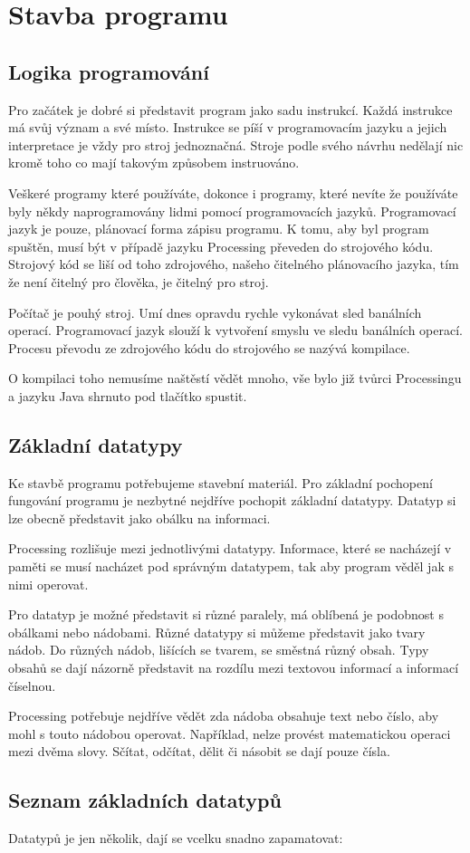 \documentclass[11pt]{book}
\newcommand{\oddil}[1]{\section{#1}\label{sec:#1}}
\newcommand{\pododdil}[1]{\subsection{#1}\label{subsec:#1}}
\begin{document}
\newpage
\oddil{Stavba programu}

\pododdil{Logika programování}
Pro začátek je dobré si představit program jako sadu instrukcí. Každá instrukce má svůj význam a své místo. Instrukce se píší v programovacím jazyku a jejich interpretace je vždy pro stroj jednoznačná. Stroje podle svého návrhu nedělají nic kromě toho co mají takovým způsobem instruováno.

Veškeré programy které používáte, dokonce i programy, které nevíte že používáte byly někdy naprogramovány lidmi pomocí programovacích jazyků. Programovací jazyk je pouze, plánovací forma zápisu programu. K tomu, aby byl program spuštěn, musí být v případě jazyku Processing převeden do strojového kódu. Strojový kód se liší od toho zdrojového, našeho čitelného plánovacího jazyka, tím že není čitelný pro člověka, je čitelný pro stroj.

Počítač je pouhý stroj. Umí dnes opravdu rychle vykonávat sled banálních operací. Programovací jazyk slouží k vytvoření smyslu ve sledu banálních operací. Procesu převodu ze zdrojového kódu do strojového se nazývá kompilace.

O kompilaci toho nemusíme naštěstí vědět mnoho, vše bylo již tvůrci Processingu a jazyku Java shrnuto pod tlačítko spustit.

\pododdil{Základní datatypy}

Ke stavbě programu potřebujeme stavební materiál. Pro základní pochopení fungování programu je nezbytné nejdříve pochopit základní datatypy. Datatyp si lze obecně představit jako obálku na informaci.

Processing rozlišuje mezi jednotlivými datatypy. Informace, které se nacházejí v paměti se musí nacházet pod správným datatypem, tak aby program věděl jak s nimi operovat.

Pro datatyp je možné představit si různé paralely, má oblíbená je podobnost s obálkami nebo nádobami. Různé datatypy si můžeme představit jako tvary nádob. Do různých nádob, lišících se tvarem, se směstná různý obsah. Typy obsahů se dají názorně představit na rozdílu mezi textovou informací a informací číselnou.

Processing potřebuje nejdříve vědět zda nádoba obsahuje text nebo číslo, aby mohl s touto nádobou operovat. Například, nelze provést matematickou operaci mezi dvěma slovy. Sčítat, odčítat, dělit či násobit se dají pouze čísla.


\pododdil{Seznam základních datatypů}
Datatypů je jen několik, dají se vcelku snadno zapamatovat:
\end{document}
